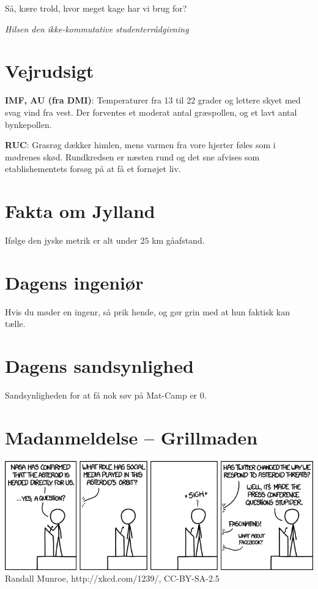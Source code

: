 \begin{minipage}[b]{0.95\linewidth}
\begin{minipage}[t]{0.47\textwidth}
Så, kære trold, hvor meget kage har vi brug for?

{\flushright\emph{Hilsen den ikke-kommutative studenterrådgivning}}

\end{minipage}%
\hfill\begin{minipage}[t]{0.47\textwidth}
\vspace{2mm}
\section*{Vejrudsigt}
\textbf{IMF, AU (fra DMI)}: Temperaturer fra 13 til 22 grader og lettere skyet med svag vind fra vest. Der forventes et moderat antal græspollen, og et lavt antal bynkepollen.

\textbf{RUC}: Grasrøg dækker himlen, mens varmen fra vore hjerter føles som i mødrenes skød. Rundkredsen er næsten rund og det sne afvises som etablishementets forsøg på at få et fornøjet liv.

\section*{Fakta om Jylland}
Ifølge den jyske metrik er alt under $25$ km gåafstand.

\section*{Dagens ingeniør}
Hvis du møder en ingenr, så prik hende, og gør grin med at hun faktisk kan tælle.

\section*{Dagens sandsynlighed}
Sandsynligheden for at få nok søv på Mat-Camp er $0$.

\section*{Madanmeldelse -- Grillmaden}




\end{minipage}

\begin{center}
\includegraphics[width=\linewidth]{social_media.png}
\tiny Randall Munroe, http://xkcd.com/1239/, CC-BY-SA-2.5


\end{center}
\end{minipage}
